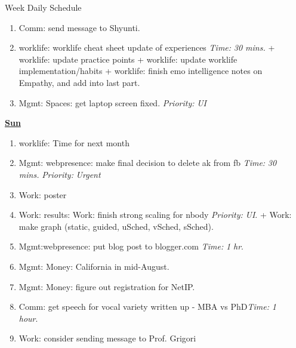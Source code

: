 \documentclass[serif, mathserif, final]{beamer}
\newcommand{\timeEst}[1]{\textit{Time:} \textit{#1}}
\newcommand{\priority}[1]{\textit{Priority:} \textit{#1}}
\begin{document}
\begin{frame}{}
\begin{columns}
\begin{column}{0.50\linewidth}
\begin{block}{Week Daily Schedule}
\begin{enumerate}
\tiny \item \tiny Comm: send message to Shyunti. 
\item \tiny worklife: worklife cheat sheet update of experiences \timeEst{30 mins.} +  worklife: update practice points + worklife: update worklife implementation/habits +  worklife: finish emo intelligence notes on Empathy, and add into last part. 
\item \tiny Mgmt: Spaces: get laptop screen fixed. \priority{UI} 
\end{enumerate} 

\textbf{\small \underline{Sun}}
\begin{enumerate}
\tiny \item \tiny worklife: Time for next month 
\item \tiny Mgmt: webpresence: make final decision to delete ak from fb \timeEst{30 mins.} \priority{Urgent} 
\item \tiny Work: poster
\item \tiny Work: results:  Work: finish strong scaling for nbody \priority{UI}. +  Work: make graph (static, guided, uSched, vSched, sSched). 

\item \tiny Mgmt:webpresence: put blog post to blogger.com \timeEst{1 hr}.  
\item \tiny Mgmt: Money: California in mid-August. 
\item \tiny Mgmt: Money: figure out registration for NetIP.
\item \tiny Comm: get speech for vocal variety written up - MBA vs PhD\timeEst{1 hour}. 

\item \tiny Work: consider sending message to Prof. Grigori 
\end{enumerate} 

\end{block} 


\end{column}%

\begin{column}{0.20\linewidth} 


\end{column}
\end{columns}
\end{frame}
\end{document}
